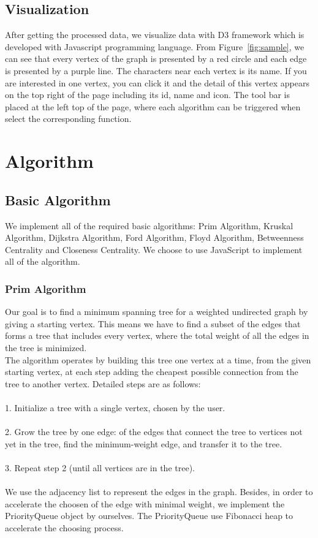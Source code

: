 \documentclass{article}
\begin{document}
\subsection{Visualization}
After getting the processed data, we visualize data with D3 framework which is developed with Javascript programming language. From Figure~\ref{fig:sample}, we can see that every vertex of the graph is presented by a red circle and each edge is presented by a purple line. The characters near each vertex is its name. If you are interested in one vertex, you can click it and the detail of this vertex appears on the top right of the page including its id, name and icon. The tool bar is placed at the left top of the page, where each algorithm can be triggered when select the corresponding function. \\ 

\section{Algorithm}
\subsection{Basic Algorithm}
We implement all of the required basic algorithms: Prim Algorithm, Kruskal Algorithm, Dijkstra Algorithm, Ford Algorithm, Floyd Algorithm, Betweenness Centrality and Closeness Centrality. We choose to use JavaScript to implement all of the algorithm.
\subsubsection{Prim Algorithm}
Our goal is to find a minimum spanning tree for a weighted undirected graph by giving a starting vertex. This means we have to find a subset of the edges that forms a tree that includes every vertex, where the total weight of all the edges in the tree is minimized.\\
The algorithm operates by building this tree one vertex at a time, from the given starting vertex, at each step adding the cheapest possible connection from the tree to another vertex.
Detailed steps are as follows:\\\\
1. Initialize a tree with a single vertex, chosen by the user.\\\\
2. Grow the tree by one edge: of the edges that connect the tree to vertices not yet in the tree, find the minimum-weight edge, and transfer it to the tree.\\\\
3. Repeat step 2 (until all vertices are in the tree).\\\\
We use the adjacency list to represent the edges in the graph. Besides, in order to accelerate the choosen of the edge with minimal weight, we implement the PriorityQueue object by ourselves. The PriorityQueue use Fibonacci heap to accelerate the choosing process.
\end{document}

